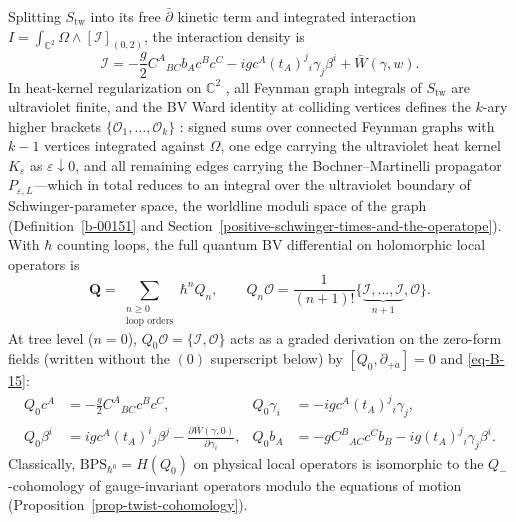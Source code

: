 \documentclass[11pt]{article}
\numberwithin{equation}{section}
\numberwithin{figure}{section}
\numberwithin{table}{section}
\begin{document}
Splitting $S_{\mathrm{tw}}$ into its free $\bar\partial$ kinetic term and integrated interaction $I=\int_{\mathbb C^2}\Omega\wedge[\mathcal I]_{(0,2)}$, the interaction density is
\begin{equation}\label{eq-sum-interaction-density}
\mathcal I=-\frac g2C^A{}_{BC}b_Ac^Bc^C
-igc^A(t_A)^j{}_i\gamma_j\beta^i
+\bar W(\gamma,w).
\end{equation}
In heat-kernel regularization on $\mathbb C^2$ \cite{Costello,Wang}, all Feynman graph integrals of $S_{\mathrm{tw}}$ are ultraviolet finite, and the BV Ward identity at colliding vertices defines the $k$-ary higher brackets $\{\mathcal O_1,\ldots,\mathcal O_k\}$ \cite{semichiral,operatope,higher,BK}: signed sums over connected Feynman graphs with $k-1$ vertices integrated against $\Omega$, one edge carrying the ultraviolet heat kernel $K_\varepsilon$ as $\varepsilon\downarrow 0$, and all remaining edges carrying the Bochner--Martinelli propagator $P_{\varepsilon,L}$---which in total reduces to an integral over the ultraviolet boundary of Schwinger-parameter space, the worldline moduli space of the graph (Definition~\ref{b-00151} and Section~\ref{positive-schwinger-times-and-the-operatope}). With $\hbar$ counting loops, the full quantum BV differential on holomorphic local operators is
\begin{equation}\label{eq-sum-Q-expansion}
\mathbf Q=\sum_{\substack{n\ge0\\\text{loop orders}}}\hbar^nQ_n,\qquad
Q_n\mathcal O=\frac{1}{(n+1)!}\bigl\{\underbrace{\mathcal I,\ldots,\mathcal I}_{n+1},\mathcal O\bigr\}.
\end{equation}
At tree level ($n=0$), $Q_0\mathcal O=\{\mathcal I,\mathcal O\}$ acts as a graded derivation on the zero-form fields (written without the $(0)$ superscript below) by $[Q_0,\partial_{+\dot a}]=0$ and \eqref{eq-B-15}:
\begin{equation}\label{eq-sum-Q0-explicit}
\begin{aligned}
Q_0c^A&=-\frac g2 C^A{}_{BC}c^Bc^C,&
Q_0\gamma_i&=-igc^A(t_A)^j{}_i\gamma_j,\\
Q_0\beta^i&=igc^A(t_A)^i{}_j\beta^j-\frac{\partial\bar W(\gamma,0)}{\partial\gamma_i},&
Q_0b_A&=-gC^B{}_{AC}c^Cb_B-ig(t_A)^j{}_i\gamma_j\beta^i.
\end{aligned}
\end{equation}
Classically, $\mathrm{BPS}_{\hbar^0}=H(Q_0)$ on physical local operators is isomorphic to the $Q_-$-cohomology of gauge-invariant operators modulo the equations of motion (Proposition~\ref{prop-twist-cohomology}).
\end{document}
